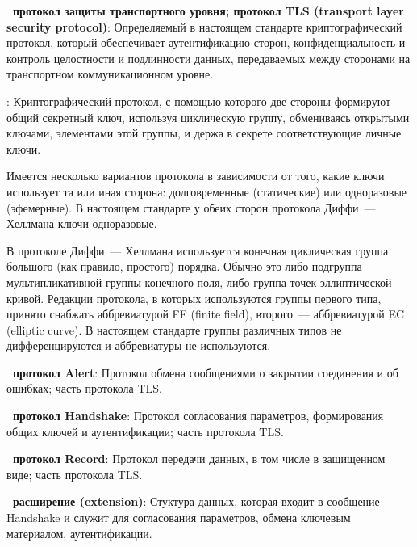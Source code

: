 {\bf \thedefctr~протокол защиты транспортного уровня; протокол TLS 
(transport layer security protocol)}: 
Определяемый в настоящем стандарте криптографический протокол, который
обеспечивает аутентификацию сторон, конфиденциальность и контроль целостности и
подлинности данных, передаваемых между сторонами на транспортном
коммуникационном уровне.

:
Криптографический протокол, с помощью которого две стороны формируют 
общий секретный ключ, используя циклическую группу, обмениваясь открытыми 
ключами, элементами этой группы, и держа в секрете соответствующие личные 
ключи. 

\begin{note}
Имеется несколько вариантов протокола в зависимости от того, какие ключи 
использует та или иная сторона: долговременные (статические) или 
одноразовые (эфемерные). В настоящем стандарте у обеих сторон протокола 
Диффи~--- Хеллмана ключи одноразовые.
\end{note}

\begin{note}
В протоколе Диффи~--- Хеллмана используется конечная циклическая группа большого
(как правило, простого) порядка. Обычно это либо подгруппа мультипликативной
группы конечного поля, либо группа точек эллиптической кривой.
%
Редакции протокола, в которых используются группы первого типа, принято снабжать
аббревиатурой FF (finite field), второго~--- аббревиатурой EC (elliptic curve).
%
В настоящем стандарте группы различных типов не дифференцируются и аббревиатуры 
не используются.
\end{note}

{\bf \thedefctr~протокол Alert}:
Протокол обмена сообщениями о закрытии соединения и об ошибках;
часть протокола TLS.

{\bf \thedefctr~протокол Handshake}:
Протокол согласования параметров, формирования общих ключей и аутентификации; 
часть протокола TLS. 


{\bf \thedefctr~протокол Record}:
Протокол передачи данных, в том числе в защищенном виде; 
часть протокола TLS. 

{\bf \thedefctr~расширение (extension)}:
Стуктура данных, которая входит в сообщение Handshake и служит для 
согласования параметров, обмена ключевым материалом, аутентификации.

